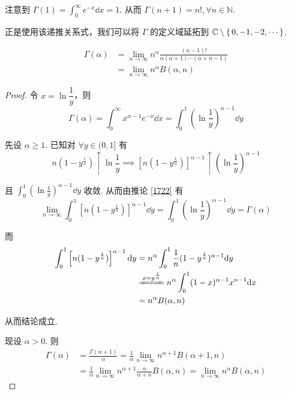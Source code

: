 注意到 $\Gamma(1)=\displaystyle\int_0^\infty e^{-x}\dd x=1$. 从而 $\Gamma(n+1)=n!,\forall n\in\mathbb{N}$.

\begin{hint}
    正是使用该递推关系式，我们可以将 $\Gamma$ 的定义域延拓到 $\mathbb{C}\setminus\set{0,-1,-2,\cdots}$.
\end{hint}


\begin{property}
$$
\begin{aligned}
    \Gamma(\alpha)&=\lim_{n\to\infty}n^\alpha\frac{(n-1)!}{\alpha(\alpha+1)\cdots(\alpha+n-1)}\\
    &=\lim_{n\to\infty}n^\alpha B(\alpha,n)
\end{aligned}
$$
\end{property}
\begin{proof}
    令 $x=\ln\dfrac{1}{y}$，则
$$
\Gamma(\alpha)=\int_0^\infty x^{\alpha-1}e^{-x}\dd x=\int_0^1\left(\ln\frac{1}{y}\right)^{\alpha-1}\dd y
$$

    先设 $\alpha\ge 1$. 已知对 $\forall y\in(0,1]$ 有
$$
n(1-y^\frac{1}{n})\uparrow\ln\frac{1}{y}\implies\left[n(1-y^\frac{1}{n})\right]^{\alpha-1}\uparrow\left(\ln\frac{1}{y}\right)^{\alpha-1}
$$

    且 $\displaystyle\int_0^1\left(\ln\frac{1}{y}\right)^{\alpha-1}\dd y$ 收敛. 从而由推论 \ref{1722} 有
$$
\lim_{n\to\infty}\int_0^1\left[n(1-y^\frac{1}{n})\right]^{\alpha-1}\dd y=\int_0^1\left(\ln\frac{1}{y}\right)^{\alpha-1}\dd y=\Gamma(\alpha)
$$

    而
$$
\begin{aligned}
    \int_0^1\left[n(1-y^\frac{1}{n})\right]^{\alpha-1}\dd y&=n^\alpha\int_0^1\frac{1}{n}(1-y^\frac{1}{n})^{\alpha-1}\dd y\\
    &\xlongequal{x=y^\frac{1}{n}}n^\alpha\int_0^1(1-x)^{\alpha-1}x^{n-1}\dd x\\
    &=n^\alpha B(\alpha,n)
\end{aligned}
$$

    从而结论成立.

    现设 $\alpha>0$. 则
$$
\begin{aligned}
    \Gamma(\alpha)&=\frac{\Gamma(\alpha+1)}{\alpha}=\frac{1}{\alpha}\lim_{n\to\infty}n^{\alpha+1}B(\alpha+1,n)\\
    &=\frac{1}{\alpha}\lim_{n\to\infty}n^{\alpha+1}\frac{\alpha}{\alpha+n}B(\alpha,n)=\lim_{n\to\infty}n^\alpha B(\alpha,n)
\end{aligned}
$$
\end{proof}